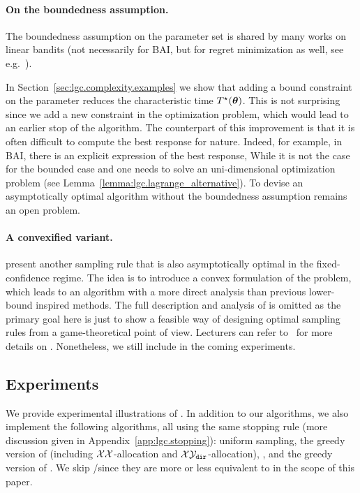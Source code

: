 \paragraph{On the boundedness assumption.}
The boundedness assumption on the parameter set is shared by many works on linear bandits (not necessarily for BAI, but for regret minimization as well, see e.g.~\citealt{abbasi-yadkori2011linear,soare2014linear}). 

In Section~\ref{sec:lgc.complexity.examples} we show that adding a bound constraint on the parameter reduces the characteristic time $T^{\star}({\boldsymbol \theta})$. This is not surprising since we add a new constraint in the optimization problem, which would lead to an earlier stop of the algorithm. The counterpart of this improvement is that it is often difficult to compute the best response for nature. Indeed, for example, in BAI, there is an explicit expression of the best response, While it is not the case for the bounded case and one needs to solve an uni-dimensional optimization problem (see Lemma~\ref{lemma:lgc.lagrange_alternative}). To devise an asymptotically optimal algorithm without the boundedness assumption remains an open problem.

\paragraph{A convexified variant.}
\cite{degenne2020game} present another sampling rule \LGC{} that is also asymptotically optimal in the fixed-confidence regime. The idea is to introduce a convex formulation of the problem, which leads to an algorithm with a more direct analysis than previous lower-bound inspired methods. The full description and analysis of \LGC{} is omitted as the primary goal here is just to show a feasible way of designing optimal sampling rules from a game-theoretical point of view. Lecturers can refer to~\cite{degenne2020game} for more details on \LGC{}. Nonetheless, we still include \LGC{} in the coming experiments.

\subsection{Experiments}\label{sec:lgc.game.experiments}

We provide experimental illustrations of \LG{}. In addition to our algorithms, we also implement the following algorithms, all using the same stopping rule (more discussion given in Appendix~\ref{app:lgc.stopping}): uniform sampling, the greedy version of \XYS (including $\mathcal{X}\mathcal{X}$-allocation and $\mathcal{X}\mathcal{Y}_{\texttt{dir}}$-allocation), \XYA, and the greedy version of \LGapE. We skip \GLUCB/\GLGapE since they are more or less equivalent to \LGapE in the scope of this paper.

